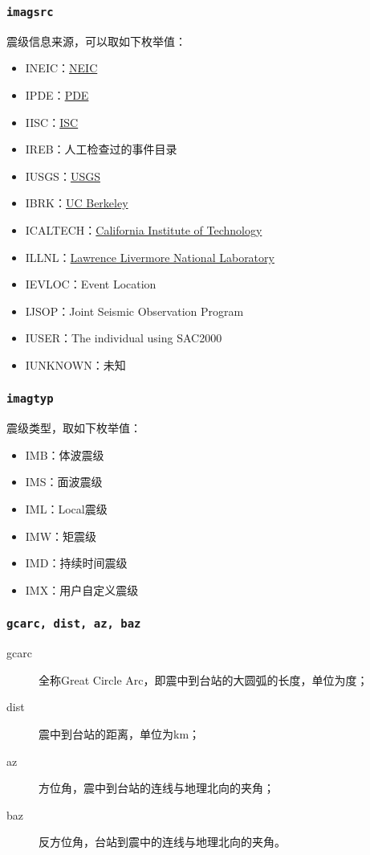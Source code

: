 \subsubsection{\texttt{imagsrc}}
震级信息来源，可以取如下枚举值：
\begin{itemize}
\ttfamily
\item INEIC：\href{http://earthquake.usgs.gov/regional/neic/}{NEIC}
\item IPDE：\href{http://earthquake.usgs.gov/data/pde.php}{PDE}
\item IISC：\href{http://www.isc.ac.uk/}{ISC}
\item IREB：人工检查过的事件目录
\item IUSGS：\href{http://earthquake.usgs.gov}{USGS}
\item IBRK：\href{http://seismo.berkeley.edu/}{UC Berkeley}
\item ICALTECH：\href{http://www.seismolab.caltech.edu}{California Institute of Technology}
\item ILLNL：\href{https://www.llnl.gov/}{Lawrence Livermore National Laboratory}
\item IEVLOC：Event Location
\item IJSOP：Joint Seismic Observation Program
\item IUSER：The individual using SAC2000
\item IUNKNOWN：未知
\end{itemize}

\subsubsection{\texttt{imagtyp}}
震级类型，取如下枚举值：
\begin{itemize}
\ttfamily
\item IMB：体波震级
\item IMS：面波震级
\item IML：Local震级
\item IMW：矩震级
\item IMD：持续时间震级
\item IMX：用户自定义震级
\end{itemize}

\subsubsection{\texttt{gcarc, dist, az, baz}}
\begin{description}
\item [gcarc] 全称Great Circle Arc，即震中到台站的大圆弧的长度，单位为度；
\item [dist] 震中到台站的距离，单位为km；
\item [az] 方位角，震中到台站的连线与地理北向的夹角；
\item [baz] 反方位角，台站到震中的连线与地理北向的夹角。
\end{description}

